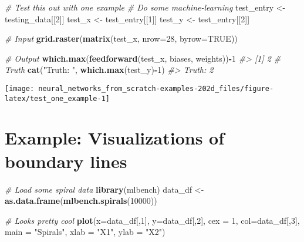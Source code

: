 \documentclass[]{book}
\newenvironment{Shaded}{\begin{snugshade}}{\end{snugshade}}
\newcommand{\CommentTok}[1]{\textcolor[rgb]{0.56,0.35,0.01}{\textit{#1}}}
\newcommand{\DataTypeTok}[1]{\textcolor[rgb]{0.13,0.29,0.53}{#1}}
\newcommand{\DecValTok}[1]{\textcolor[rgb]{0.00,0.00,0.81}{#1}}
\newcommand{\KeywordTok}[1]{\textcolor[rgb]{0.13,0.29,0.53}{\textbf{#1}}}
\newcommand{\NormalTok}[1]{#1}
\newcommand{\OperatorTok}[1]{\textcolor[rgb]{0.81,0.36,0.00}{\textbf{#1}}}
\newcommand{\OtherTok}[1]{\textcolor[rgb]{0.56,0.35,0.01}{#1}}
\newcommand{\StringTok}[1]{\textcolor[rgb]{0.31,0.60,0.02}{#1}}
\begin{document}
\begin{Shaded}
\begin{Highlighting}[]
\CommentTok{# Test this out with one example}
\CommentTok{# Do some machine-learning}
\NormalTok{test_entry <-}\StringTok{ }\NormalTok{testing_data[[}\DecValTok{2}\NormalTok{]]}
\NormalTok{test_x <-}\StringTok{ }\NormalTok{test_entry[[}\DecValTok{1}\NormalTok{]]}
\NormalTok{test_y <-}\StringTok{ }\NormalTok{test_entry[[}\DecValTok{2}\NormalTok{]]}

\CommentTok{# Input}
\KeywordTok{grid.raster}\NormalTok{(}\KeywordTok{matrix}\NormalTok{(test_x, }\DataTypeTok{nrow=}\DecValTok{28}\NormalTok{, }\DataTypeTok{byrow=}\OtherTok{TRUE}\NormalTok{))}

\CommentTok{# Output}
\KeywordTok{which.max}\NormalTok{(}\KeywordTok{feedforward}\NormalTok{(test_x, biases, weights))}\OperatorTok{-}\DecValTok{1}
\CommentTok{#> [1] 2}
\CommentTok{# Truth}
\KeywordTok{cat}\NormalTok{(}\StringTok{"Truth: "}\NormalTok{, }\KeywordTok{which.max}\NormalTok{(test_y)}\OperatorTok{-}\DecValTok{1}\NormalTok{)}
\CommentTok{#> Truth:  2}
\end{Highlighting}
\end{Shaded}

\begin{center}\texttt{[image: neural\_networks\_from\_scratch-examples-202d\_files/figure-latex/test\_one\_example-1]} \end{center}

\hypertarget{example-visualizations-of-boundary-lines}{%
\section{Example: Visualizations of boundary lines}\label{example-visualizations-of-boundary-lines}}

\begin{Shaded}
\begin{Highlighting}[]
\CommentTok{# Load some spiral data}
\KeywordTok{library}\NormalTok{(mlbench)}
\NormalTok{data_df <-}\StringTok{ }\KeywordTok{as.data.frame}\NormalTok{(}\KeywordTok{mlbench.spirals}\NormalTok{(}\DecValTok{10000}\NormalTok{))}

\CommentTok{# Looks pretty cool}
\KeywordTok{plot}\NormalTok{(}\DataTypeTok{x=}\NormalTok{data_df[,}\DecValTok{1}\NormalTok{], }\DataTypeTok{y=}\NormalTok{data_df[,}\DecValTok{2}\NormalTok{], }\DataTypeTok{cex =} \DecValTok{1}\NormalTok{, }\DataTypeTok{col=}\NormalTok{data_df[,}\DecValTok{3}\NormalTok{],}
     \DataTypeTok{main =} \StringTok{"Spirals"}\NormalTok{, }
     \DataTypeTok{xlab =} \StringTok{"X1"}\NormalTok{, }\DataTypeTok{ylab =} \StringTok{"X2"}\NormalTok{)}
\end{Highlighting}
\end{Shaded}
\end{document}
